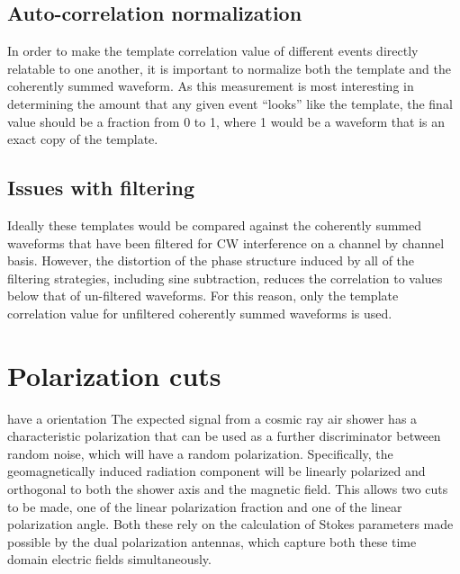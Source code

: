 		
	
	\subsection{Auto-correlation normalization}
		In order to make the template correlation value of different events directly relatable to one another, it is important to normalize both the template and the coherently summed waveform.  As this measurement is most interesting in determining the amount that any given event ``looks'' like the template, the final value should be a fraction from 0 to 1, where 1 would be a waveform that is an exact copy of the template.

	\subsection{Issues with filtering}
		Ideally these templates would be compared against the coherently summed waveforms that have been filtered for CW interference on a channel by channel basis.  However, the distortion of the phase structure induced by all of the filtering strategies, including sine subtraction, reduces the correlation to values below that of un-filtered waveforms.  For this reason, only the template correlation value for unfiltered coherently summed waveforms is used.

\section{Polarization cuts}
	have a  orientation The expected signal from a cosmic ray air shower has a characteristic polarization that can be used as a further discriminator between random noise, which will have a random polarization.  Specifically, the geomagnetically induced radiation component will be linearly polarized and orthogonal to both the shower axis and the magnetic field.  This allows two cuts to be made, one of the linear polarization fraction and one of the linear polarization angle.  Both these rely on the calculation of Stokes parameters made possible by the dual polarization antennas, which capture both these time domain electric fields simultaneously.

